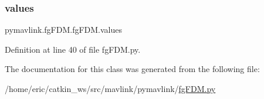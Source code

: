 \subsubsection{\texorpdfstring{values}{values}}
{\footnotesize\ttfamily pymavlink.\+fg\+F\+D\+M.\+fg\+F\+D\+M.\+values}



Definition at line 40 of file fg\+F\+D\+M.\+py.



The documentation for this class was generated from the following file\+:\begin{DoxyCompactItemize}
\item 
/home/eric/catkin\+\_\+ws/src/mavlink/pymavlink/\mbox{\hyperlink{fgFDM_8py}{fg\+F\+D\+M.\+py}}\end{DoxyCompactItemize}
